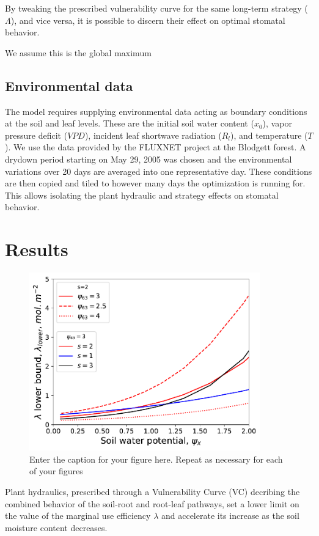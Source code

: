 \documentclass[utf8]{frontiersSCNS} %
\begin{document}
By tweaking the prescribed vulnerability curve for the same long-term strategy ($\Lambda$), and vice versa, it is possible to discern their effect on optimal stomatal behavior. 

We assume this is the global maximum

\subsection{Environmental data} 

The model requires supplying environmental data acting as boundary conditions at the soil and leaf levels. These are the initial soil water content ($x_0$), vapor pressure deficit ($VPD$), incident leaf shortwave radiation ($R_l$), and temperature ($T$). We use the data provided by the FLUXNET project at the Blodgett forest. A drydown period starting on May 29, 2005 was chosen and the environmental variations over 20 days are averaged into one representative day. These conditions are then copied and tiled to however many days the optimization is running for. This allows isolating the plant hydraulic and strategy effects on stomatal behavior.

\section{Results}

\begin{figure}[h!]
\begin{center}
\includegraphics[width=10cm]{Fig1.pdf}
\end{center}
\caption{ Enter the caption for your figure here.  Repeat as  necessary for each of your figures}\label{fig:1}
\end{figure}

Plant hydraulics, prescribed through a Vulnerability Curve (VC) decribing the combined behavior of the soil-root and root-leaf pathways, set a lower limit on the value of the marginal use efficiency $\lambda$ and accelerate its increase as the soil moisture content decreases.
\end{document}
